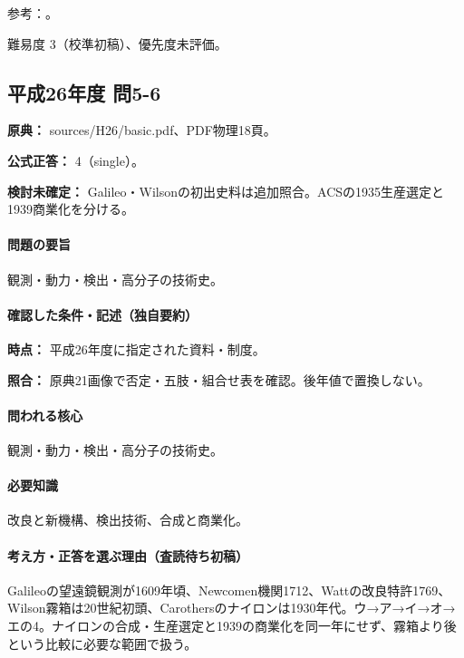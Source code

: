 \par 参考：\cite{env58_steam}。

\par 難易度 3（校準初稿）、優先度未評価。

\subsection{平成26年度 問5-6}
\label{q:h26-reg-basic-5-6}

\noindent\textbf{原典：} sources/H26/basic.pdf、PDF物理18頁。

\textbf{公式正答：} 4（single）。

\par\textbf{検討未確定：} Galileo・Wilsonの初出史料は追加照合。ACSの1935生産選定と1939商業化を分ける。

\paragraph{問題の要旨} 観測・動力・検出・高分子の技術史。

\paragraph{確認した条件・記述（独自要約）}\mbox{}\par

\noindent\textbf{時点：} 平成26年度に指定された資料・制度。\par

\noindent\textbf{照合：} 原典21画像で否定・五肢・組合せ表を確認。後年値で置換しない。\par

\paragraph{問われる核心} 観測・動力・検出・高分子の技術史。

\paragraph{必要知識} 改良と新機構、検出技術、合成と商業化。

\paragraph{考え方・正答を選ぶ理由（査読待ち初稿）} Galileoの望遠鏡観測が1609年頃、Newcomen機関1712、Wattの改良特許1769、Wilson霧箱は20世紀初頭、Carothersのナイロンは1930年代。ウ→ア→イ→オ→エの4。ナイロンの合成・生産選定と1939の商業化を同一年にせず、霧箱より後という比較に必要な範囲で扱う。

